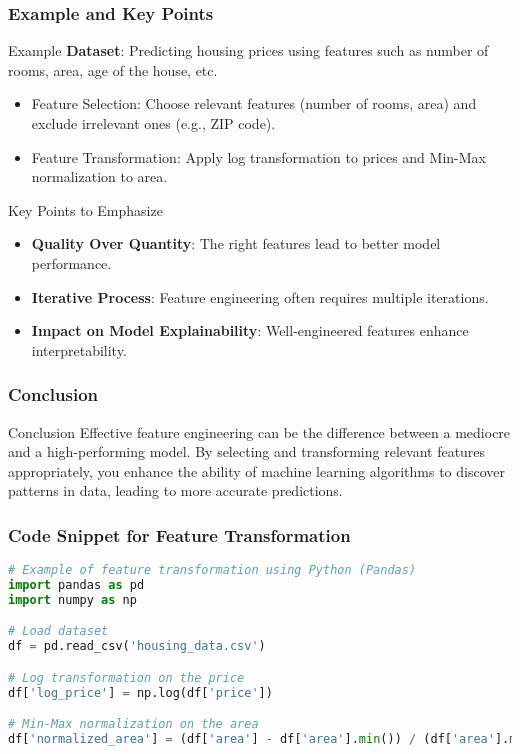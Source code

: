 \documentclass[aspectratio=169]{beamer}
\begin{document}
\begin{frame}[fragile]
    \frametitle{Example and Key Points}
    \begin{block}{Example}
        \textbf{Dataset}: Predicting housing prices using features such as number of rooms, area, age of the house, etc.
        \begin{itemize}
            \item Feature Selection: Choose relevant features (number of rooms, area) and exclude irrelevant ones (e.g., ZIP code).
            \item Feature Transformation: Apply log transformation to prices and Min-Max normalization to area.
        \end{itemize}
    \end{block}
    
    \begin{block}{Key Points to Emphasize}
        \begin{itemize}
            \item \textbf{Quality Over Quantity}: The right features lead to better model performance.
            \item \textbf{Iterative Process}: Feature engineering often requires multiple iterations.
            \item \textbf{Impact on Model Explainability}: Well-engineered features enhance interpretability.
        \end{itemize}
    \end{block}
\end{frame}

\begin{frame}[fragile]
    \frametitle{Conclusion}
    \begin{block}{Conclusion}
        Effective feature engineering can be the difference between a mediocre and a high-performing model. 
        By selecting and transforming relevant features appropriately, you enhance the ability of machine learning algorithms to discover patterns in data, leading to more accurate predictions.
    \end{block}
\end{frame}

\begin{frame}[fragile]
    \frametitle{Code Snippet for Feature Transformation}
    \begin{lstlisting}[language=Python]
# Example of feature transformation using Python (Pandas)
import pandas as pd
import numpy as np

# Load dataset
df = pd.read_csv('housing_data.csv')

# Log transformation on the price
df['log_price'] = np.log(df['price'])

# Min-Max normalization on the area
df['normalized_area'] = (df['area'] - df['area'].min()) / (df['area'].max() - df['area'].min())
    \end{lstlisting}
\end{frame}
\end{document}
